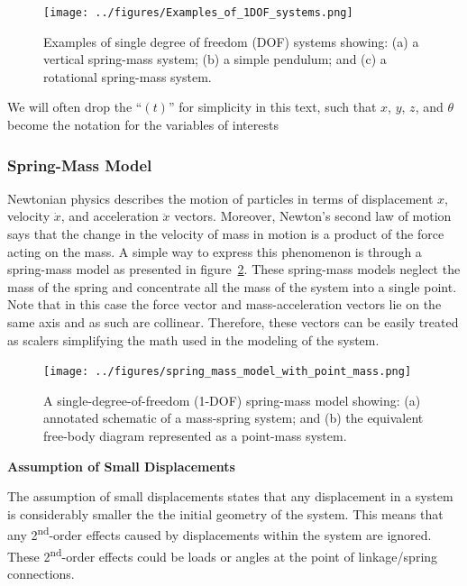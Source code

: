 \documentclass[12pt,letter]{article}
\begin{document}
		\begin{figure}[H]
			\centering
			\texttt{[image: ../figures/Examples\_of\_1DOF\_systems.png]}
			\caption{Examples of single degree of freedom (DOF) systems showing: (a) a vertical spring-mass system; (b) a simple pendulum; and (c) a rotational spring-mass system.}
			\label{fig:Examples_of_1DOF_systems}
		\end{figure}


		\begin{note}
			We will often drop the ``$(t)$'' for simplicity in this text, such that $x$,  $y$,  $z$, and  $\theta$ become the notation for the variables of interests
		\end{note}






		\subsubsection{Spring-Mass Model}


							
            Newtonian physics describes the motion of particles in terms of displacement $x$, velocity $\dot{x}$, and acceleration $\ddot{x}$ vectors. Moreover, Newton's second law of motion says that the change in the velocity of mass in motion is a product of the force acting on the mass. A simple way to express this phenomenon is through a spring-mass model as presented in figure~\ref{fig:spring_mass_model_with_point_mass}. These spring-mass models neglect the mass of the spring and concentrate all the mass of the system into a single point. Note that in this case the force vector and mass-acceleration vectors lie on the same axis and as such are collinear. Therefore, these vectors can be easily treated as scalers simplifying the math used in the modeling of the system.     

			\begin{figure}[H]
				\centering
				\texttt{[image: ../figures/spring\_mass\_model\_with\_point\_mass.png]}
				\caption{A single-degree-of-freedom (1-DOF) spring-mass model showing: (a) annotated schematic of a mass-spring system; and (b) the equivalent free-body diagram represented as a point-mass system.}
				\label{fig:spring_mass_model_with_point_mass}
			\end{figure}	

		\begin{review}
			
			\textbf{Assumption of Small Displacements}

		\noindent The assumption of small displacements states that any displacement in a system is considerably smaller the the initial geometry of the system. This means that any 2\textsuperscript{nd}-order effects caused by displacements within the system are ignored. These 2\textsuperscript{nd}-order effects could be loads or angles at the point of linkage/spring connections. 
		\end{review}
\end{document}
